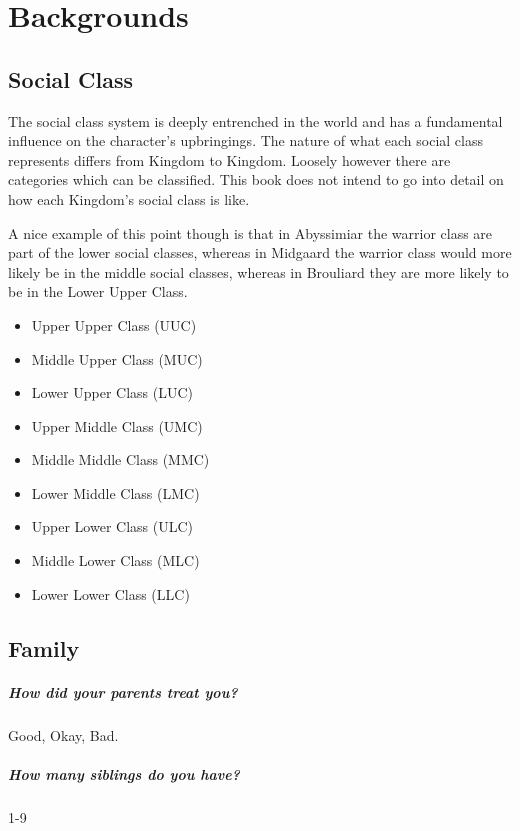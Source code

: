 \documentclass[8pt]{memoir} %
\begin{document}

\newpage
\chapter{Backgrounds}\label{backgrounds}


\section{Social Class} The social class system is deeply entrenched in the world and has a fundamental influence on the character's upbringings. The nature of what each social class represents differs from Kingdom to Kingdom. Loosely however there are categories which can be classified. This book does not intend to go into detail on how each Kingdom's social class is like.

A nice example of this point though is that in Abyssimiar the warrior class are part of the lower social classes, whereas in Midgaard the warrior class would more likely be in the middle social classes, whereas in Brouliard they are more likely to be in the Lower Upper Class.

\begin{itemize}
    \item Upper Upper Class (UUC)
    \item Middle Upper Class (MUC)
    \item Lower Upper Class (LUC)
    \item Upper Middle Class (UMC)
    \item Middle Middle Class (MMC)
    \item Lower Middle Class (LMC)
    \item Upper Lower Class (ULC)
    \item Middle Lower Class (MLC)
    \item Lower Lower Class (LLC)
\end{itemize}

\section{Family}
\paragraph{How did your parents treat you?} Good, Okay, Bad.
\paragraph{How many siblings do you have?} 1-9
\end{document}

